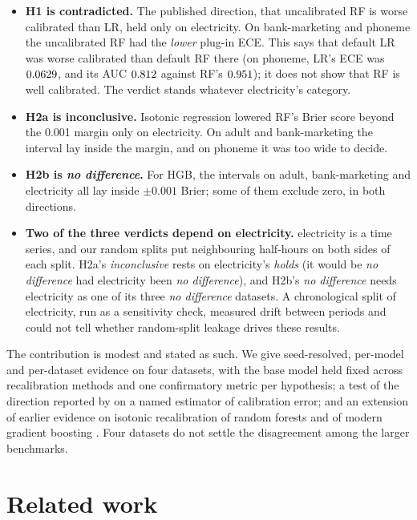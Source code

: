 \documentclass[11pt]{article}
\newcommand{\ds}[1]{\textsf{#1}}
\newcommand{\ad}{\ds{adult}}
\newcommand{\bm}{\ds{bank-marketing}}
\newcommand{\el}{\ds{electricity}}
\newcommand{\ph}{\ds{phoneme}}
\newcommand{\cat}[1]{\emph{#1}}
\begin{document}
\begin{itemize}
  \item \textbf{H1 is contradicted.} The published direction, that uncalibrated RF is worse
        calibrated than LR, held only on \el. On \bm{} and \ph{} the uncalibrated RF had the
        \emph{lower} plug-in ECE. This says that default LR was worse calibrated than
        default RF there (on \ph, LR's ECE was $0.0629$, and its AUC
        $0.812$ against RF's $0.951$); it does not show that RF is
        well calibrated. The verdict stands whatever \el's category.
  \item \textbf{H2a is inconclusive.} Isotonic regression lowered RF's Brier score beyond the
        0.001 margin only on \el. On \ad{} and \bm{} the interval lay inside the margin, and
        on \ph{} it was too wide to decide.
  \item \textbf{H2b is \cat{no difference}.} For HGB, the intervals on \ad, \bm{} and \el{}
        all lay inside $\pm0.001$ Brier; some of them exclude zero, in both directions.
  \item \textbf{Two of the three verdicts depend on \el.} \el{} is a time series, and our
        random splits put neighbouring half-hours on both sides of each split. H2a's
        \cat{inconclusive} rests on \el's \cat{holds} (it would be \cat{no difference} had
        \el{} been \cat{no difference}), and H2b's \cat{no difference} needs \el{} as one of
        its three \cat{no difference} datasets. A chronological split of \el, run as a
        sensitivity check, measured drift between periods and could not tell whether
        random-split leakage drives these results.
\end{itemize}

The contribution is modest and stated as such. We give seed-resolved, per-model and
per-dataset evidence on four datasets, with the base model held fixed across recalibration
methods and one confirmatory metric per hypothesis; a test of the direction reported by
\citet{niculescumizil2005} on a named estimator of calibration error; and an extension of
earlier evidence on isotonic recalibration of random forests and of modern gradient boosting
\citep{fonseca2017}. Four datasets do not settle the disagreement among the larger
benchmarks.

\section{Related work}
\label{sec:related}
\end{document}

